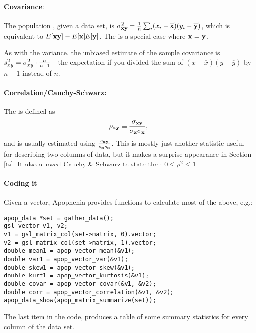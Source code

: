 \paragraph{Covariance:} The population , given a data set,
is $\sigma^2_{{\bf x}{\bf y}} = {1\over n}\sum_i(x_i-\overline {{\bf x}})(y_i-\overline {{\bf y}})$, which is equivalent
to $E[{\bf x}{\bf y}]-E[{\bf x}]E[{\bf y}]$. The  is a special case where ${\bf x}={\bf y}$.

As with the variance, the unbiased estimate of the 
sample covariance is $s^2_{xy}=\sigma^2_{xy}\cdot {n\over n-1}$---the
expectation if you  divided the sum of $(x-\overline x)(y-\overline y)$ by
$n-1$ instead of $n$.

\paragraph{Correlation/Cauchy-Schwarz:} The  is
defined as $$\rho_{\xv\yv}\equiv{\sigma_{\xv\yv}\over \sigma_\xv
\sigma_\xv},$$ and is usually estimated using ${s_{{\bf x}{\bf y}}\over
s_{\bf x} s_{\bf x}}$.  This is mostly just another statistic useful for
describing two columns of data, but it makes a surprise appearance
in Section \ref{ts}. It also allowed Cauchy \& Schwarz to state
the : $0\leq \rho^2 \leq 1$.
\label{correlation}

\paragraph{Coding it} Given a vector, Apophenia provides functions to
calculate most of the above, e.g.:

 
 
\begin{lstlisting}
apop_data *set = gather_data();
gsl_vector v1, v2;
v1 = gsl_matrix_col(set->matrix, 0).vector;
v2 = gsl_matrix_col(set->matrix, 1).vector;
double mean1 = apop_vector_mean(&v1);
double var1 = apop_vector_var(&v1);
double skew1 = apop_vector_skew(&v1);
double kurt1 = apop_vector_kurtosis(&v1);
double covar = apop_vector_covar(&v1, &v2);
double corr = apop_vector_correlation(&v1, &v2);
apop_data_show(apop_matrix_summarize(set));
\end{lstlisting}
The last item in the code,  produces a table of
some summary statistics for every column of the data set.

